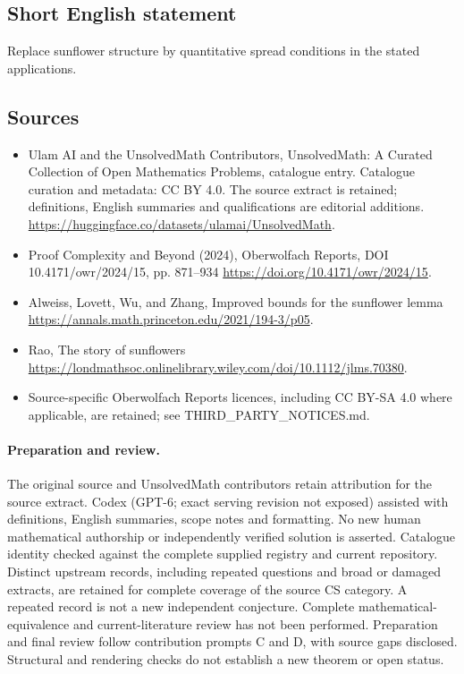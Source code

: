 \documentclass[11pt]{article}
\begin{document}
\subsection{Short English statement}
Replace sunflower structure by quantitative spread conditions in the stated applications.
\subsection{Sources}
\begin{itemize}
\item[\hypertarget{source:statement:1}{S1}] Ulam AI and the UnsolvedMath Contributors, UnsolvedMath: A Curated Collection of Open Mathematics Problems, catalogue entry. Catalogue curation and metadata: CC BY 4.0. The source extract is retained; definitions, English summaries and qualifications are editorial additions.
\url{https://huggingface.co/datasets/ulamai/UnsolvedMath}.
\item[\hypertarget{source:statement:2}{S2}] Proof Complexity and Beyond (2024), Oberwolfach Reports, DOI 10.4171/owr/2024/15, pp. 871--934
\url{https://doi.org/10.4171/owr/2024/15}.
\item[\hypertarget{source:statement:3}{S3}] Alweiss, Lovett, Wu, and Zhang, Improved bounds for the sunflower lemma
\url{https://annals.math.princeton.edu/2021/194-3/p05}.
\item[\hypertarget{source:statement:4}{S4}] Rao, The story of sunflowers
\url{https://londmathsoc.onlinelibrary.wiley.com/doi/10.1112/jlms.70380}.
\item Source-specific Oberwolfach Reports licences, including CC BY-SA 4.0 where applicable, are retained; see THIRD\_PARTY\_NOTICES.md.
\end{itemize}
\paragraph{Preparation and review.}
The original source and UnsolvedMath contributors retain attribution for the source extract. Codex (GPT-6; exact serving revision not exposed) assisted with definitions, English summaries, scope notes and formatting. No new human mathematical authorship or independently verified solution is asserted. Catalogue identity checked against the complete supplied registry and current repository. Distinct upstream records, including repeated questions and broad or damaged extracts, are retained for complete coverage of the source CS category. A repeated record is not a new independent conjecture. Complete mathematical-equivalence and current-literature review has not been performed. Preparation and final review follow contribution prompts C and D, with source gaps disclosed. Structural and rendering checks do not establish a new theorem or open status.
\label{end:statement}
\end{document}
